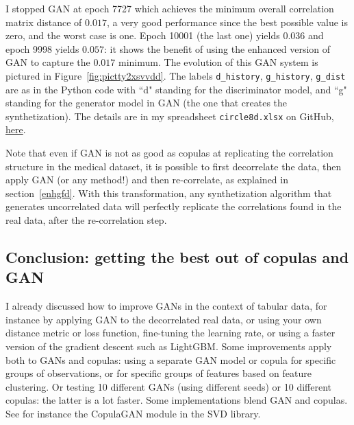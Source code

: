 \documentclass[oneside,10pt]{book}
\begin{document}
I stopped GAN at epoch 7727 which achieves the minimum overall 
\textcolor{index}{correlation matrix distance} of $0.017$, a very good performance since the best possible value is zero, and the worst case is one. Epoch 10001 (the last one) yields  
$0.036$ and epoch 9998 yields $0.057$: it shows the benefit of using the enhanced version of GAN to capture the $0.017$ minimum.
The evolution of this GAN system is pictured in Figure~\ref{fig:pictty2xsvvdd}. The labels \texttt{d\_history}, 
\texttt{g\_history}, \texttt{g\_dist} are as in the Python code with ``d" standing for the discriminator model, and ``g" standing for the generator model in GAN (the one that creates the synthetization).
The details are in my spreadsheet \texttt{circle8d.xlsx} on GitHub, \href{https://github.com/VincentGranville/Main/blob/main/circle8D.xlsx}{here}.

Note that even if GAN is not as good as copulas at replicating the correlation structure in the medical dataset, it is possible to first 
\textcolor{index}{decorrelate} the data, then apply GAN (or any method!) and then re-correlate, as explained in section~\ref{enhgfd}. With this transformation, any synthetization algorithm that
 generates uncorrelated data will perfectly replicate the correlations found in the real data, after the re-correlation step.


\subsection{Conclusion: getting the best out of copulas and GAN}\label{gantrasd}

I already discussed how to improve GANs in the context of tabular data, for instance by applying GAN to the 
\textcolor{index}{decorrelated} real data, or using your own distance metric or 
\textcolor{index}{loss function}, fine-tuning the \textcolor{index}{learning rate}, or using a faster version of the gradient descent such as \textcolor{index}{LightGBM}. Some improvements apply both to GANs and copulas: using a separate GAN model or copula for specific groups of observations, or for specific groups of features based on 
\textcolor{index}{feature clustering}. Or testing 10 different GANs (using different seeds) or 10 different copulas: the latter is a lot faster.
Some implementations blend GAN and copulas. See for instance the CopulaGAN module in the \textcolor{index}{SVD} library. 
\end{document}
